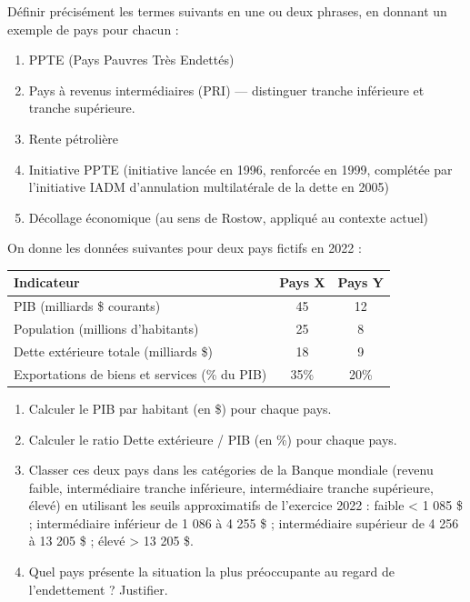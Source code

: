 \documentclass[11pt]{article}
\begin{document}
\begin{exercice}
Définir précisément les termes suivants en une ou deux phrases, en donnant un exemple de pays pour chacun :
\begin{enumerate}
\item PPTE (Pays Pauvres Très Endettés)
\item Pays à revenus intermédiaires (PRI) — distinguer tranche inférieure et tranche supérieure.
\item Rente pétrolière
\item Initiative PPTE (initiative lancée en 1996, renforcée en 1999, complétée par l'initiative IADM d'annulation multilatérale de la dette en 2005)
\item Décollage économique (au sens de Rostow, appliqué au contexte actuel)
\end{enumerate}
\end{exercice}

\begin{exercice}
On donne les données suivantes pour deux pays fictifs en 2022 :
\begin{center}
\begin{tabular}{|l|c|c|}\hline
\textbf{Indicateur} & \textbf{Pays X} & \textbf{Pays Y} \\ \hline
PIB (milliards \$ courants) & 45 & 12 \\
Population (millions d'habitants) & 25 & 8 \\
Dette extérieure totale (milliards \$) & 18 & 9 \\
Exportations de biens et services (\% du PIB) & 35\% & 20\% \\ \hline
\end{tabular}
\end{center}
\begin{enumerate}
\item Calculer le PIB par habitant (en \$) pour chaque pays.
\item Calculer le ratio Dette extérieure / PIB (en \%) pour chaque pays.
\item Classer ces deux pays dans les catégories de la Banque mondiale (revenu faible, intermédiaire tranche inférieure, intermédiaire tranche supérieure, élevé) en utilisant les seuils approximatifs de l'exercice 2022 : faible < 1 085 \$ ; intermédiaire inférieur de 1 086 à 4 255 \$ ; intermédiaire supérieur de 4 256 à 13 205 \$ ; élevé > 13 205 \$.
\item Quel pays présente la situation la plus préoccupante au regard de l'endettement ? Justifier.
\end{enumerate}
\end{exercice}
\end{document}
